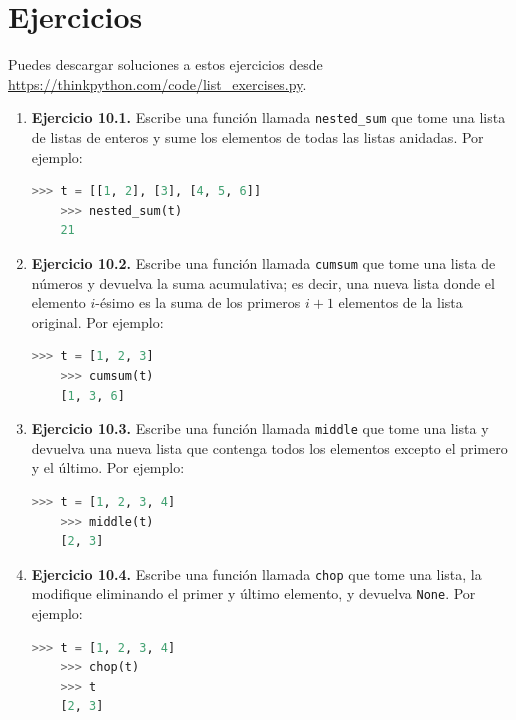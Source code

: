 \section*{Ejercicios}

Puedes descargar soluciones a estos ejercicios desde \url{https://thinkpython.com/code/list_exercises.py}.

\begin{enumerate}
    \item \textbf{Ejercicio 10.1.} Escribe una función llamada \texttt{nested\_sum} que tome una lista de listas de enteros y sume los elementos de todas las listas anidadas. Por ejemplo:
    
    \begin{lstlisting}[language=Python]
    >>> t = [[1, 2], [3], [4, 5, 6]] 
    >>> nested_sum(t) 
    21
    \end{lstlisting}
    
    \item \textbf{Ejercicio 10.2.} Escribe una función llamada \texttt{cumsum} que tome una lista de números y devuelva la suma acumulativa; es decir, una nueva lista donde el elemento \(i\)-ésimo es la suma de los primeros \(i+1\) elementos de la lista original. Por ejemplo:
    
    \begin{lstlisting}[language=Python]
    >>> t = [1, 2, 3] 
    >>> cumsum(t) 
    [1, 3, 6]
    \end{lstlisting}
    
    \item \textbf{Ejercicio 10.3.} Escribe una función llamada \texttt{middle} que tome una lista y devuelva una nueva lista que contenga todos los elementos excepto el primero y el último. Por ejemplo:
    
    \begin{lstlisting}[language=Python]
    >>> t = [1, 2, 3, 4] 
    >>> middle(t) 
    [2, 3]
    \end{lstlisting}
    
    \item \textbf{Ejercicio 10.4.} Escribe una función llamada \texttt{chop} que tome una lista, la modifique eliminando el primer y último elemento, y devuelva \texttt{None}. Por ejemplo:
    
    \begin{lstlisting}[language=Python]
    >>> t = [1, 2, 3, 4] 
    >>> chop(t) 
    >>> t 
    [2, 3]
    \end{lstlisting}
    

\end{enumerate}

